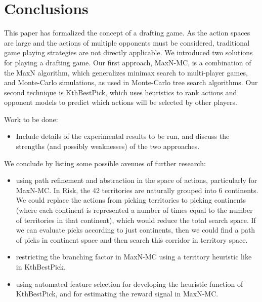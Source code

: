 \documentclass[letterpaper]{article}
\numberwithin{equation}{section}
\numberwithin{theorem}{section}
\numberwithin{lemma}{section}
\numberwithin{df}{section}
\begin{document}
\section{Conclusions}


This paper has formalized the concept of a drafting game.  As the action spaces are large and the actions of multiple opponents must be considered, traditional game playing strategies are not directly applicable.  We introduced two solutions for playing a drafting game.  Our first approach, MaxN-MC, is a combination of the MaxN algorithm, which generalizes minimax search to multi-player games, and Monte-Carlo simulations, as used in Monte-Carlo tree search algorithms.  Our second technique is KthBestPick, which uses heuristics to rank actions and opponent models to predict which actions will be selected by other players.  

Work to be done:
\begin{itemize}
	\item Include details of the experimental results to be run, and discuss the strengths (and possibly weaknesses) of the two approaches.
\end{itemize}

We conclude by listing some possible avenues of further research:
\begin{itemize}
	\item using path refinement and abstraction in the space of actions, particularly for MaxN-MC.  In Risk, the 42 territories are naturally grouped into 6 continents.  We could replace the actions from picking territories to picking continents (where each continent is represented a number of times equal to the number of territories in that continent), which would reduce the total search space.  If we can evaluate picks according to just continents, then we could find a path of picks in continent space and then search this corridor in territory space.
	\item restricting the branching factor in MaxN-MC using a territory heuristic like in KthBestPick.
	\item using automated feature selection for developing the heuristic function of KthBestPick, and for estimating the reward signal in MaxN-MC.
\end{itemize}

%
%

%
%


\end{document}
